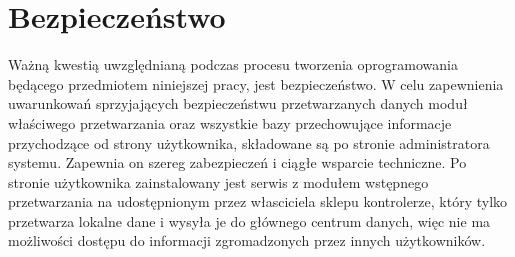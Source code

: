 \documentclass[a4paper]{book}
\begin{document}
\section{Bezpieczeństwo}
Ważną kwestią uwzględnianą podczas procesu tworzenia oprogramowania będącego przedmiotem niniejszej pracy, jest bezpieczeństwo. W celu zapewnienia uwarunkowań sprzyjających bezpieczeństwu przetwarzanych danych moduł właściwego przetwarzania oraz wszystkie bazy przechowujące informacje przychodzące od strony użytkownika, składowane są po stronie administratora systemu. Zapewnia on szereg zabezpieczeń i ciągłe wsparcie techniczne. Po stronie użytkownika zainstalowany jest serwis z modułem wstępnego przetwarzania na udostępnionym przez własciciela sklepu kontrolerze, który tylko przetwarza lokalne dane i wysyła je do głównego centrum danych, więc nie ma możliwości dostępu do informacji zgromadzonych przez innych użytkowników.
\end{document}
